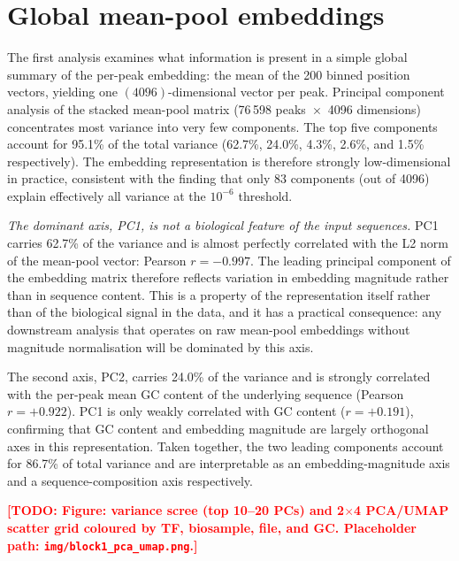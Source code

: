 \documentclass[12pt,a4paper,twoside,final]{book}
\newcommand{\todo}[1]{\textcolor{red}{\textbf{[TODO: #1]}}}
\newcommand{\fix}[1]{\textit{#1}}
\begin{document}
\section{Global mean-pool embeddings}
\label{sec:results-block1}

The first analysis examines what information is present in a simple global summary of the per-peak embedding: the mean of the 200 binned position vectors, yielding one $(4096)$-dimensional vector per peak.
Principal component analysis of the stacked mean-pool matrix (76\,598 peaks~$\times$~4096 dimensions) concentrates most variance into very few components.
The top five components account for 95.1\% of the total variance (62.7\%, 24.0\%, 4.3\%, 2.6\%, and 1.5\% respectively).
The embedding representation is therefore strongly low-dimensional in practice, consistent with the finding that only 83 components (out of 4096) explain effectively all variance at the $10^{-6}$ threshold.

\fix{The dominant axis, PC1, is not a biological feature of the input sequences.} %
PC1 carries 62.7\% of the variance and is almost perfectly correlated with the L2 norm of the mean-pool vector: Pearson $r = -0.997$. %
The leading principal component of the embedding matrix therefore reflects variation in embedding magnitude rather than in sequence content.
This is a property of the representation itself rather than of the biological signal in the data, and it has a practical consequence: any downstream analysis that operates on raw mean-pool embeddings without magnitude normalisation will be dominated by this axis.

The second axis, PC2, carries 24.0\% of the variance and is strongly correlated with the per-peak mean GC content of the underlying sequence (Pearson $r = +0.922$).
PC1 is only weakly correlated with GC content ($r = +0.191$), confirming that GC content and embedding magnitude are largely orthogonal axes in this representation.
Taken together, the two leading components account for 86.7\% of total variance and are interpretable as an embedding-magnitude axis and a sequence-composition axis respectively.

\todo{Figure: variance scree (top 10--20 PCs) and 2$\times$4 PCA/UMAP scatter grid coloured by TF, biosample, file, and GC. Placeholder path: \texttt{img/block1\_pca\_umap.png}.} %
\end{document}
